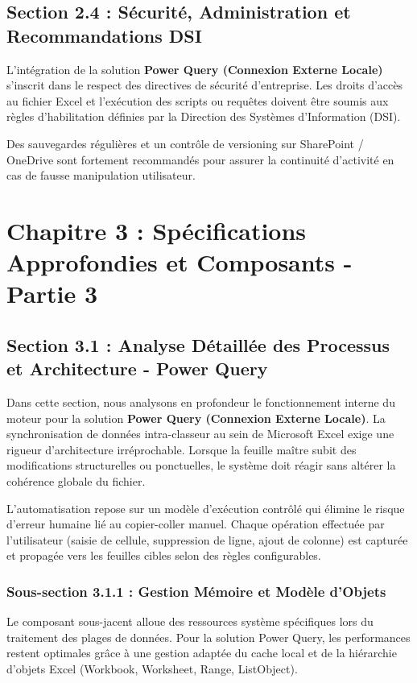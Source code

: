\documentclass[12pt,a4paper]{report}
\begin{document}
\section{Section 2.4 : Sécurité, Administration et Recommandations DSI}
L'intégration de la solution \textbf{Power Query (Connexion Externe Locale)} s'inscrit dans le respect des directives de sécurité d'entreprise. Les droits d'accès au fichier Excel et l'exécution des scripts ou requêtes doivent être soumis aux règles d'habilitation définies par la Direction des Systèmes d'Information (DSI).

Des sauvegardes régulières et un contrôle de versioning sur SharePoint / OneDrive sont fortement recommandés pour assurer la continuité d'activité en cas de fausse manipulation utilisateur.


\chapter{Chapitre 3 : Spécifications Approfondies et Composants - Partie 3}

\section{Section 3.1 : Analyse Détaillée des Processus et Architecture - Power Query}
Dans cette section, nous analysons en profondeur le fonctionnement interne du moteur pour la solution \textbf{Power Query (Connexion Externe Locale)}. La synchronisation de données intra-classeur au sein de Microsoft Excel exige une rigueur d'architecture irréprochable. Lorsque la feuille maître subit des modifications structurelles ou ponctuelles, le système doit réagir sans altérer la cohérence globale du fichier.

L'automatisation repose sur un modèle d'exécution contrôlé qui élimine le risque d'erreur humaine lié au copier-coller manuel. Chaque opération effectuée par l'utilisateur (saisie de cellule, suppression de ligne, ajout de colonne) est capturée et propagée vers les feuilles cibles selon des règles configurables.


\subsection{Sous-section 3.1.1 : Gestion Mémoire et Modèle d'Objets}
Le composant sous-jacent alloue des ressources système spécifiques lors du traitement des plages de données. Pour la solution Power Query, les performances restent optimales grâce à une gestion adaptée du cache local et de la hiérarchie d'objets Excel (Workbook, Worksheet, Range, ListObject).
\end{document}
